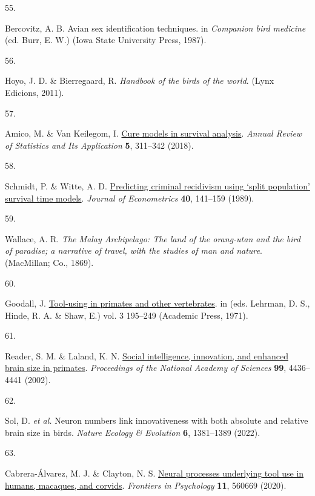 \documentclass[
  man,floatsintext]{apa6}
\newlength{\cslhangindent}
\newlength{\csllabelwidth}
\newlength{\cslentryspacingunit} %
\newenvironment{CSLReferences}[2] %
 {%
  \setlength{\parindent}{0pt}
  \ifodd #1
  \let\oldpar\par
  \def\par{\hangindent=\cslhangindent\oldpar}
  \fi
  \setlength{\parskip}{#2\cslentryspacingunit}
 }%
 {}
\newcommand{\CSLLeftMargin}[1]{\parbox[t]{\csllabelwidth}{#1}}
\newcommand{\CSLRightInline}[1]{\parbox[t]{\linewidth - \csllabelwidth}{#1}\break}
\begin{document}
\begin{CSLReferences}{0}{0}
\leavevmode{}%
\CSLLeftMargin{55. }%
\CSLRightInline{Bercovitz, A. B. Avian sex identification techniques. in \emph{Companion bird medicine} (ed. Burr, E. W.) (Iowa State University Press, 1987).}

\leavevmode{}%
\CSLLeftMargin{56. }%
\CSLRightInline{Hoyo, J. D. \& Bierregaard, R. \emph{Handbook of the birds of the world}. (Lynx Edicions, 2011).}

\leavevmode{}%
\CSLLeftMargin{57. }%
\CSLRightInline{Amico, M. \& Van Keilegom, I. \href{https://doi.org/10.1146/annurev-statistics-031017-100101}{Cure models in survival analysis}. \emph{Annual Review of Statistics and Its Application} \textbf{5}, 311--342 (2018).}

\leavevmode{}%
\CSLLeftMargin{58. }%
\CSLRightInline{Schmidt, P. \& Witte, A. D. \href{https://doi.org/10.1016/0304-4076(89)90034-1}{Predicting criminal recidivism using {`split population'} survival time models}. \emph{Journal of Econometrics} \textbf{40}, 141--159 (1989).}

\leavevmode{}%
\CSLLeftMargin{59. }%
\CSLRightInline{Wallace, A. R. \emph{The {M}alay {A}rchipelago: The land of the orang-utan and the bird of paradise; a narrative of travel, with the studies of man and nature}. (MacMillan; Co., 1869).}

\leavevmode{}%
\CSLLeftMargin{60. }%
\CSLRightInline{Goodall, J. \href{https://doi.org/10.1016/S0065-3454(08)60157-6}{Tool-using in primates and other vertebrates}. in (eds. Lehrman, D. S., Hinde, R. A. \& Shaw, E.) vol. 3 195--249 (Academic Press, 1971).}

\leavevmode{}%
\CSLLeftMargin{61. }%
\CSLRightInline{Reader, S. M. \& Laland, K. N. \href{https://doi.org/10.1073/pnas.062041299}{Social intelligence, innovation, and enhanced brain size in primates}. \emph{Proceedings of the National Academy of Sciences} \textbf{99}, 4436--4441 (2002).}

\leavevmode{}%
\CSLLeftMargin{62. }%
\CSLRightInline{Sol, D. \emph{et al.} Neuron numbers link innovativeness with both absolute and relative brain size in birds. \emph{Nature Ecology \& Evolution} \textbf{6}, 1381--1389 (2022).}

\leavevmode{}%
\CSLLeftMargin{63. }%
\CSLRightInline{Cabrera-Álvarez, M. J. \& Clayton, N. S. \href{https://doi.org/10.3389/fpsyg.2020.560669}{Neural processes underlying tool use in humans, macaques, and corvids}. \emph{Frontiers in Psychology} \textbf{11}, 560669 (2020).}


\end{CSLReferences}
\end{document}
